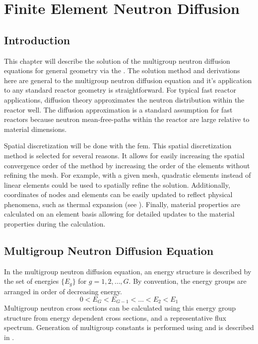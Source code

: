 \chapter{Finite Element Neutron Diffusion}
\label{ch:neutronDiffusion}

\section{Introduction}
  This chapter will describe the solution of the multigroup neutron diffusion
  equations for general geometry via the . The solution method
  and derivations here are general to the multigroup neutron diffusion equation
  and it's application to any standard reactor geometry is
  straightforward. For typical fast reactor applications, diffusion theory
  approximates the neutron distribution within the reactor well. The diffusion
  approximation is a standard assumption for fast reactors because neutron
  mean-free-paths within the reactor are large relative to material dimensions.

  Spatial discretization will be done with the \gls{fem}. This spatial 
  discretization method is selected for several reasons. It allows for easily 
  increasing the spatial convergence order of the method by increasing the order
  of the elements without refining the mesh. For example, with a given mesh, 
  quadratic elements instead of linear elements could be used to spatially 
  refine the solution. Additionally, coordinates of nodes and elements can be 
  easily updated to reflect physical phenomena, such as thermal expansion (see 
  ). Finally, material properties are calculated on 
  an element basis allowing for detailed updates to the material properties 
  during the calculation.

\section{Multigroup Neutron Diffusion Equation}
  In the multigroup neutron diffusion equation, an energy structure is 
  described by the set of energies $\{E_g\}$ for $g = 1,2,\ldots,G$.
  By convention, the energy groups are arranged in order of decreasing energy.
  \begin{equation}
    0 < E_G < E_{G-1} < \ldots < E_2 < E_1
  \end{equation}
  Multigroup neutron cross sections can be calculated using this energy group 
  structure from energy dependent cross sections, and a representative flux 
  spectrum. Generation of multigroup constants is performed using \mcc and is 
  described in .

